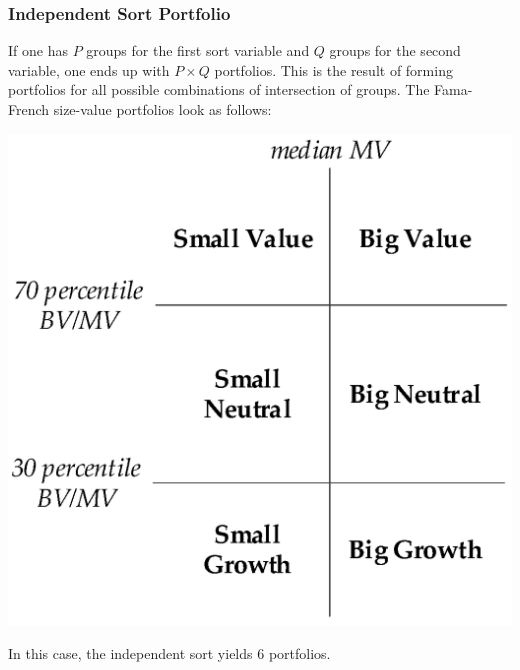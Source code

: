 \documentclass[xcolor=dvipsnames, english, 8pt]{beamer}
\begin{document}
\begin{frame}
    \frametitle{Independent Sort Portfolio}
    If one has $P$ groups for the first sort variable and $Q$ groups for the second variable, one ends up with $P\times Q$ portfolios. This is the result of forming portfolios for all possible combinations of intersection of groups. The Fama-French size-value portfolios look as follows:\vspace{0.25cm} \\

    \begin{center}
\includegraphics[scale=0.75]{sorts1}\vspace{0.25cm}\\
    \end{center}
In this case, the independent sort yields 6 portfolios.
\end{frame}
\end{document}
